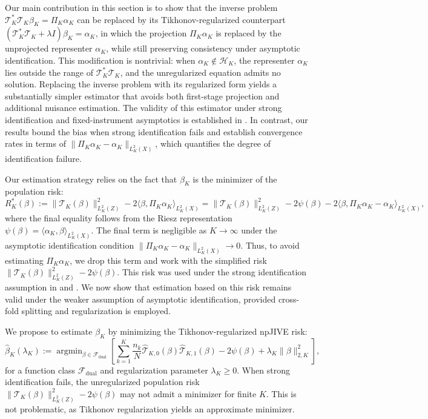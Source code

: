 \documentclass[11pt]{article}
\theoremstyle{plain}
\theoremstyle{definition}
\theoremstyle{remark}
\theoremstyle{definition}
\DeclareMathOperator*{\argmin}{argmin}
\begin{document}
Our main contribution in this section is to show that the inverse problem
\(\mathcal{T}_K^* \mathcal{T}_K \beta_K = \Pi_K \alpha_K\) can be replaced by its
Tikhonov-regularized counterpart
\((\mathcal{T}_K^* \mathcal{T}_K + \lambda I)\beta_K = \alpha_K\), in which the
projection \(\Pi_K \alpha_K\) is replaced by the unprojected representer
\(\alpha_K\), while still preserving consistency under asymptotic
identification. This modification is nontrivial: when
\(\alpha_K \notin \mathcal{H}_K\), the representer \(\alpha_K\) lies outside the
range of \(\mathcal{T}_K^* \mathcal{T}_K\), and the unregularized equation admits
no solution. Replacing the inverse problem with its regularized form yields a
substantially simpler estimator that avoids both first-stage projection and
additional nuisance estimation. The validity of this estimator under strong
identification and fixed-instrument asymptotics is established in
\citet{bennett2023inference, bennett2023source, bennett2023minimax}. In contrast,
our results bound the bias when strong identification fails and establish
convergence rates in terms of
\(\|\Pi_K \alpha_K - \alpha_K\|_{L^2_K(X)}\), which quantifies the degree of
identification failure.


 





Our estimation strategy relies on the fact that $\beta_K$ is the minimizer of the population risk:
\[
R_K^*(\beta) := \|\mathcal{T}_K(\beta)\|^2_{L^2_K(Z)} - 2 \langle \beta, \Pi_K \alpha_K \rangle_{L^2_K(X)}
= \|\mathcal{T}_K(\beta)\|^2_{L^2_K(Z)} - 2 \psi(\beta) - 2 \langle \beta, \Pi_K \alpha_K - \alpha_K \rangle_{L^2_K(X)},
\]
where the final equality follows from the Riesz representation \(\psi(\beta) = \langle \alpha_K, \beta \rangle_{L^2_K(X)}\). The final term is negligible as \(K \to \infty\) under the asymptotic identification condition \(\|\Pi_K \alpha_K - \alpha_K\|_{L^2_K(X)} \to 0\). Thus, to avoid estimating \(\Pi_K \alpha_K\), we drop this term and work with the simplified risk \(\|\mathcal{T}_K(\beta)\|^2_{L^2_K(Z)} - 2\psi(\beta)\). This risk was used under the strong identification assumption in \cite{bennett2023inference} and \cite{bennett2023source}. We now show that estimation based on this risk remains valid under the weaker assumption of asymptotic identification, provided cross-fold splitting and regularization is employed.






We propose to estimate \( \beta_K \) by minimizing the Tikhonov-regularized npJIVE risk:
\[
\widehat{\beta}_K(\lambda_K) := \argmin_{\beta \in \mathcal{F}_{\mathrm{dual}}} \left[ \sum_{k=1}^K \frac{n_k}{N} \widehat{\mathcal{T}}_{K,0}(\beta) \widehat{\mathcal{T}}_{K,1}(\beta) - 2 \psi(\beta) + \lambda_K \| \beta \|_{2,K}^2 \right],
\]
for a function class \( \mathcal{F}_{\mathrm{dual}} \) and regularization parameter $\lambda_K \geq 0$. When strong identification fails, the unregularized population risk \( \|\mathcal{T}_K(\beta)\|^2_{L^2_K(Z)} - 2 \psi(\beta) \) may not admit a minimizer for finite \( K \). This is not problematic, as Tikhonov regularization yields an approximate minimizer.
 
\end{document}
